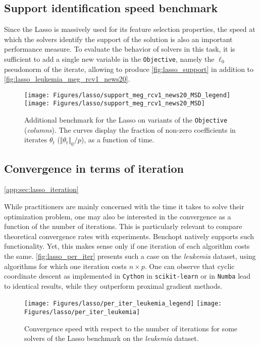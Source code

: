 \documentclass{article}
\newcommand{\rebuttal}[1]{#1}
\newlength{\figwidth}
\begin{document}
\subsection{Support identification speed benchmark}


Since the Lasso is massively used for its feature selection properties, the speed at which the solvers identify the support of the solution is also an important performance measure.
To evaluate the behavior of solvers in this task, it is sufficient to add a single new variable in the \texttt{Objective}, namely the $\ell_0$ pseudonorm of the iterate, allowing to produce \autoref{fig:lasso_support} in addition to \autoref{fig:lasso_leukemia_meg_rcv1_news20}.


\begin{figure}
    \centering
    \texttt{[image: Figures/lasso/support\_meg\_rcv1\_news20\_MSD\_legend]}
    \texttt{[image: Figures/lasso/support\_meg\_rcv1\_news20\_MSD]}
    \caption{Additional benchmark for the Lasso on variants of the \texttt{Objective} (\emph{columns}). The curves display the fraction of non-zero coefficients in iterates $\theta_t$ ($\Vert \theta_t \Vert_0 /p$), as a function of time.}
    \label{fig:lasso_support}
\end{figure}



\subsection{\rebuttal{Convergence in terms of iteration}}
\autoref{app:sec:lasso_iteration}

\rebuttal{While practitioners are mainly concerned with the time it takes to solve their optimization problem, one may also be interested in the convergence as a function of the number of iterations. This is particularly relevant to compare theoretical convergence rates with experiments. Benchopt natively supports such functionality. Yet, this makes sense only if one iteration of each algorithm costs the same. \autoref{fig:lasso_per_iter} presents such a case on the \emph{leukemia} dataset, using algorithms for which one iteration costs $n \times p$. One can observe that cyclic coordinate descent as implemented in \texttt{Cython} in \texttt{scikit-learn} or in \texttt{Numba} lead to identical results, while they outperform proximal gradient methods.}

\begin{figure}
    \centering
    \texttt{[image: Figures/lasso/per\_iter\_leukemia\_legend]}
    \texttt{[image: Figures/lasso/per\_iter\_leukemia]}
    \caption{\rebuttal{Convergence speed with respect to the number of iterations for some solvers of the Lasso benchmark on the \emph{leukemia} dataset.}}
    \label{fig:lasso_per_iter}
\end{figure}
\end{document}
